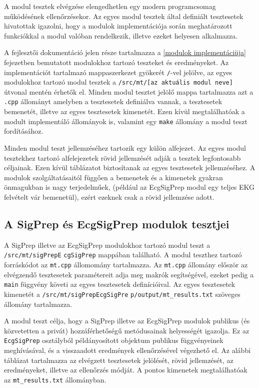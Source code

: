 \documentclass[oneside,titlepage,12pt,a4paper]{report}
\begin{document}
A modul tesztek elvégzése elengedhetlen egy modern programcsomag működésének ellenőrzésekor. Az egyes modul tesztek által definiált tesztesetek hivatottak igazolni, hogy a modulok implementációja során meghatározott funkciókkal a modul valóban rendelkezik, illetve ezeket helyesen alkalmazza. \par A fejlesztői dokumentáció jelen része tartalmazza a \ref{modulok implementáciüja} fejezetben bemutatott modulokhoz tartozó teszteket és eredményeket. Az implementációt tartalmazó mappaszerkezet gyökerét \texttt{/}-vel jelölve, az egyes modulokhoz tartozó modul tesztek a \texttt{/src/mt/[az aktuális modul neve]} útvonal mentén érhetők el. Minden modul tesztet jelölő mappa tartalmazza azt a \texttt{.cpp} állományt amelyben a tesztesetek definiálva vannak, a tesztesetek bemenetét, illetve az egyes tesztesetek kimenetét. Ezen kívül megtalálhatóak a modult implementáló állományok is, valamint egy \texttt{make} állomány a modul teszt fordításához. 
\par Minden modul teszt jellemzéséhez tartozik egy külön alfejezet. Az egyes modul tesztekhez tartozó alfelejezetek rövid jellemzését adják a tesztek legfontosabb céljainak. Ezen kívül táblázatot biztosítanak az egyes tesztesetek jellemzéséhez. A modulok szolgáltatásaitól függően a bemenetek és a kimenetek gyakran önmagukban is nagy terjedelműek, (például az EcgSigPrep modul egy teljes EKG felvételt vár bemenetül), ezért ezeknek csak a rövid jellemzése adott.   

\subsection{A SigPrep és EcgSigPrep modulok tesztjei}

A SigPrep illetve az EcgSigPrep modulokhoz tartozó modul teszt a \texttt{/src/mt/sigPrepE} \linebreak \texttt{cgSigPrep} mappában található. A modul teszthez tartozó forráskódot az \texttt{mt.cpp} állomomány tartalmazza. Az \texttt{mt.cpp} állomány először az elvégzendő tesztesetek paramétereit adja meg makrók segítségével, ezeket pedig a \texttt{main} függvény követi az egyes \linebreak  tesztesetek definícióival. Az egyes tesztesetek kimenetét a \texttt{/src/mt/sigPrepEcgSigPre} \linebreak  \texttt{p/output/mt\_results.txt} szöveges állomány tartalmazza. 
\par A modul teszt célja, hogy a SigPrep illetve az EcgSigPrep modulok publikus (és közvetetten a privát) hozzáférhetőségű metódusainak helyességét igazolja. Ez az \texttt{EcgSigPrep} osztályból példányosított objektum publikus függvényeinek meghívásával, és a visszaadott eredmények ellenőrzésével végezhető el. Az alábbi táblázat tartalmazza az elvégzett tesztesetek jelölését, rövid jellemzését, az eredményeket, illetve az ellenőrzés módját. A pontos kimenetek megtalálhatóak az \texttt{mt\_results.txt} állományban. 
\end{document}
